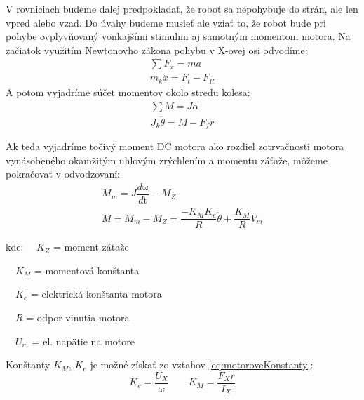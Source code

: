 V rovniciach budeme ďalej predpokladať, že robot sa nepohybuje do strán, ale len vpred alebo vzad. Do úvahy budeme musieť ale vziať to, že robot bude pri pohybe ovplyvňovaný vonkajšími stimulmi aj samotným momentom motora. Na začiatok využitím Newtonovho zákona pohybu v X-ovej osi odvodíme:
\begin{equation}
\begin{gathered}
\sum{F_x} = ma \\
m_k \ddot{x} = F_t - F_R
\end{gathered}
\label{eq:forceOnWheeles}
\end{equation}
A potom vyjadríme súčet momentov okolo stredu kolesa:
\begin{equation}
\begin{gathered}
\sum{M} = J \alpha \\
J_k\ddot{\theta} = M - F_f r
\end{gathered}
\label{eq:zotrvacnost}
\end{equation}

Ak teda vyjadríme točivý moment DC motora ako rozdiel zotrvačnosti motora vynásobeného okamžitým uhlovým zrýchlením a momentu záťaže, môžeme pokračovať v odvodzovaní:
\begin{equation}
\begin{gathered}
M_m = J \dfrac{d \mathrm{\omega}}{d \mathrm{t}} - M_Z
\\
M = M_m - M_Z = \dfrac{-K_M K_e}{R} \dot{\theta}+ \dfrac{K_M}{R} V_m
\end{gathered}
\label{eq:moment}
\end{equation}

kde:
$\quad K_Z$ = moment záťaže

$\quad K_M$ = momentová konštanta

$\quad K_e$ = elektrická konštanta motora

$\quad R$ = odpor vinutia motora

$\quad U_m$ = el. napätie na motore

Konštanty $K_M$, $K_e$ je možné získať zo vzťahov \eqref{eq:motoroveKonstanty}:
\begin{equation}
K_e = \dfrac{U_X}{\omega} \quad \quad K_M = \dfrac{F_X r}{I_X}
\label{eq:motoroveKonstanty}
\end{equation}


